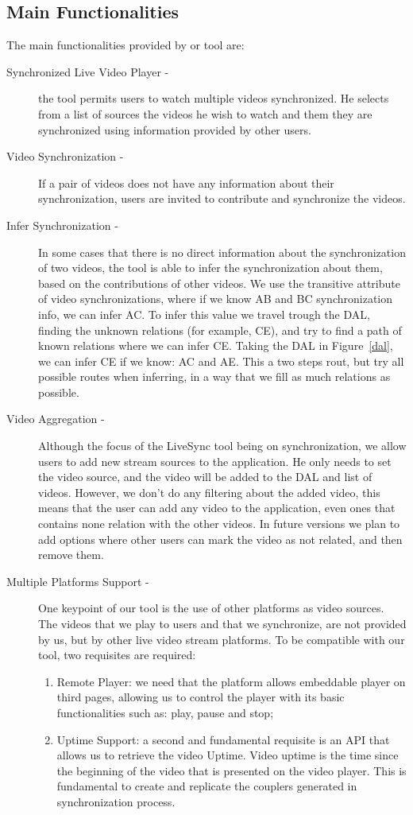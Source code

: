 \documentclass{sig-alternate-05-2015}
\begin{document}
\subsection{Main Functionalities}
The main functionalities provided by or tool are:
\begin{description}
	\item[Synchronized Live Video Player -]	the tool permits users to watch multiple videos synchronized. He selects from a list of sources the videos he wish to watch and them they are synchronized using information provided by other users.
	
	\item[Video Synchronization -] If a pair of videos does not have any information about their synchronization, users are invited to contribute and synchronize the videos.
	
	\item[Infer Synchronization -] In some cases that there is no direct information about the synchronization of two videos, the tool is able to infer the synchronization about them, based on the contributions of other videos. We use the transitive attribute of video synchronizations, where if we know AB and BC synchronization info, we can infer AC. To infer this value we travel trough the DAL, finding the unknown relations (for example, CE), and try to find a path of known relations where we can infer CE. Taking the DAL in Figure~\ref{dal}, we can infer CE if we know: AC and AE. This a two steps rout, but try all possible routes when inferring, in a way that we fill as much relations as possible.
	
	\item[Video Aggregation -]	Although the focus of the LiveSync tool being on synchronization, we allow users to add new stream sources to the application. He only needs to set the video source, and the video will be added to the DAL and list of videos. However, we don't do any filtering about the added video, this means that the user can add any video to the application, even ones that contains none relation with the other videos. In future versions we plan to add options where other users can mark the video as not related, and then remove them.
	
	\item[Multiple Platforms Support -] One keypoint of our tool is the use of other platforms as video sources. The videos that we play to users and that we synchronize, are not provided by us, but by other live video stream platforms. To be compatible with our tool, two requisites are required:
	\begin{enumerate}
		\item Remote Player: we need that the platform allows embeddable player on third pages, allowing us to control the player with its basic functionalities such as: play, pause and stop;
		\item Uptime Support: a second and fundamental requisite is an API that allows us to retrieve the video Uptime. Video uptime is the time since the beginning of the video that is presented on the video player. This is fundamental to create and replicate the couplers generated in synchronization process.
	\end{enumerate}
	

\end{description}
\end{document}
